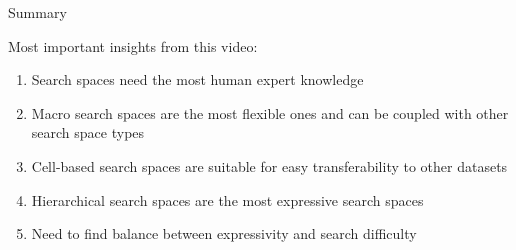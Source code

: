 \documentclass[main]{subfiles}
\begin{document}
\begin{frame}{Summary} 

Most important insights from this video:

\begin{enumerate}
    \item Search spaces need the most human expert knowledge
    \item Macro search spaces are the most flexible ones and can be coupled with other search space types
    \item Cell-based search spaces are suitable for easy transferability to other datasets
    \item Hierarchical search spaces are the most expressive search spaces
    \item Need to find balance between expressivity and search difficulty
\end{enumerate}


\end{frame}
\end{document}
